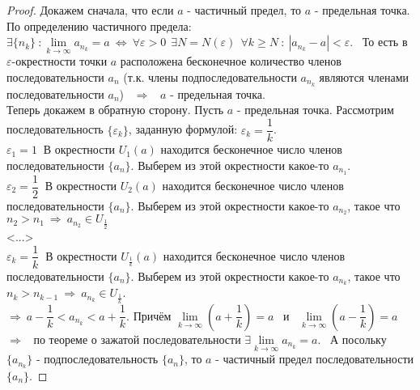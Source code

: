 \documentclass[12pt]{article}
\begin{document}
\begin{proof}
    Докажем сначала, что если $a$ - частичный предел, то $a$ - предельная точка. По определению частичного предела: $\exists \{n_k\} \ : \lim\limits_{k \to \infty} a_{n_k} = a \ \Leftrightarrow \ \forall \varepsilon > 0 \ \ \exists N = N(\varepsilon) \ \ \forall k \geq N \ : \ |a_{n_k} - a| < \varepsilon$. \ То есть в $\varepsilon$-окрестности точки $a$ расположена бесконечное количество членов последовательности $a_{n}$ (т.к. члены подпоследовательности $a_{n_k}$ являются членами последовательности $a_n$) \ $\Rightarrow$ \ $a$ - предельная точка. \\
    Теперь докажем в обратную сторону. Пусть $a$ - предельная точка. Рассмотрим последовательность $\{\varepsilon_k\}$, заданную формулой: $\varepsilon_k = \dfrac1k$. \\
    $\varepsilon_1 = 1 \ $ В окрестности $ U_1(a)$ находится бесконечное число членов последовательности $\{a_n\}$. Выберем из этой окрестности какое-то $a_{n_1}$. \\
    $\varepsilon_2 = \dfrac12 \ $ В окрестности $ U_2(a)$ находится бесконечное число членов последовательности $\{a_n\}$. Выберем из этой окрестности какое-то $a_{n_2}$, такое что $n_2 > n_1 \ \Rightarrow \ a_{n_2} \in U_{\frac12}$ \\
    <...> \\
    $\varepsilon_k = \dfrac1k \ $ В окрестности $ U_{\frac1k}(a)$ находится бесконечное число членов последовательности $\{a_n\}$. Выберем из этой окрестности какое-то $a_{n_k}$, такое что $n_k > n_{k-1} \ \Rightarrow \ a_{n_k} \in U_{\frac1k}$. \\
    $\Rightarrow \ a - \dfrac1k < a_{n_k} < a + \dfrac1k$. Причём $\lim\limits_{k \to \infty} \left(a + \dfrac1k \right) = a$ \ и \  $\lim\limits_{k \to \infty} \left(a - \dfrac1k\right) = a$ \ $\Rightarrow$ \ по теореме о зажатой последовательности $\exists \lim\limits_{k \to \infty} a_{n_k} = a$. \ А посольку $\{a_{n_k}\}$ - подпоследовательность $\{a_n\}$, то $a$ - частичный предел последовательности $\{a_n\}$. 
\end{proof}
\end{document}
